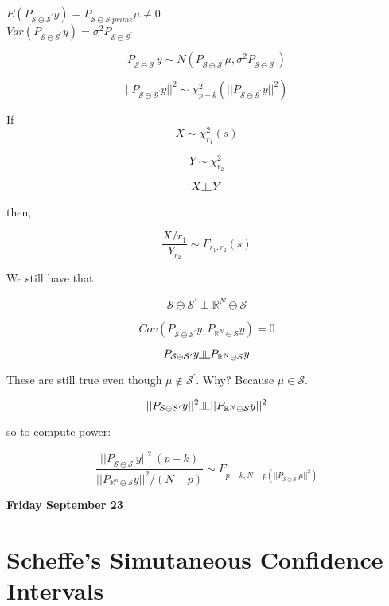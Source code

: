 \documentclass[11pt,fleqn]{book} %
\newcommand{\indep}{\rotatebox[origin=c]{90}{$\models$}}
\begin{document}
$E(P_{\mathcal{S} \ominus \mathcal{S}^\prime}y) = P_{\mathcal{S} \ominus \mathcal{S}^]prime}\mu \neq 0$\\

$Var(P_{\mathcal{S} \ominus \mathcal{S}^\prime}y) = \sigma^2 P_{\mathcal{S} \ominus \mathcal{S}^\prime}$

$$P_{\mathcal{S} \ominus \mathcal{S}^\prime}y \sim N(P_{\mathcal{S} \ominus \mathcal{S}^\prime}\mu, \sigma^2 P_{\mathcal{S} \ominus \mathcal{S}^\prime}) $$

$$||P_{\mathcal{S} \ominus \mathcal{S}^\prime}y ||^2 \sim \chi^2_{p-k} (||P_{\mathcal{S} \ominus \mathcal{S}^\prime}y ||^2)$$

\begin{definition}
	If 
	$$X \sim \chi^2_{r_1}(s) $$

	$$Y \sim \chi^2_{r_2} $$ 
	
	$$X \indep Y $$


	then, 

	$$ \frac{X/r_1}{Y_{r_2}} \sim F_{r_1, r_2} (s) $$
\end{definition}


We still have that

$$\mathcal{S} \ominus \mathcal{S}^\prime \perp \mathbb{R}^N \ominus \mathcal{S} $$

$$Cov( P_{\mathcal{S} \ominus \mathcal{S}^\prime}y, P_{\mathbb{R}^N \ominus \mathcal{S}}y) = 0 $$

$$P_{\mathcal{S} \ominus \mathcal{S}^\prime}y \indep P_{\mathbb{R}^N \ominus \mathcal{S}}y $$

These are still true even though $\mu \notin \mathcal{S}^\prime$. Why? Because $\mu \in \mathcal{S}$.

$$||P_{\mathcal{S} \ominus \mathcal{S}^\prime}y||^2 \indep ||P_{\mathbb{R}^N \ominus \mathcal{S}}y ||^2  $$

so to compute power:

$$\frac{||P_{\mathcal{S} \ominus \mathcal{S}^\prime}y ||^2 \ (p-k)}{|| P_{\mathbb{R}^n \ominus \mathcal{S}}y||^2 / (N-p)} \sim F_{p-k, N-p (||P_{\mathcal{S} \ominus \mathcal{S}^\prime}\mu ||^2)} $$


\textbf{Friday September 23}\\

\section{Scheffe's Simutaneous Confidence Intervals}
\end{document}
